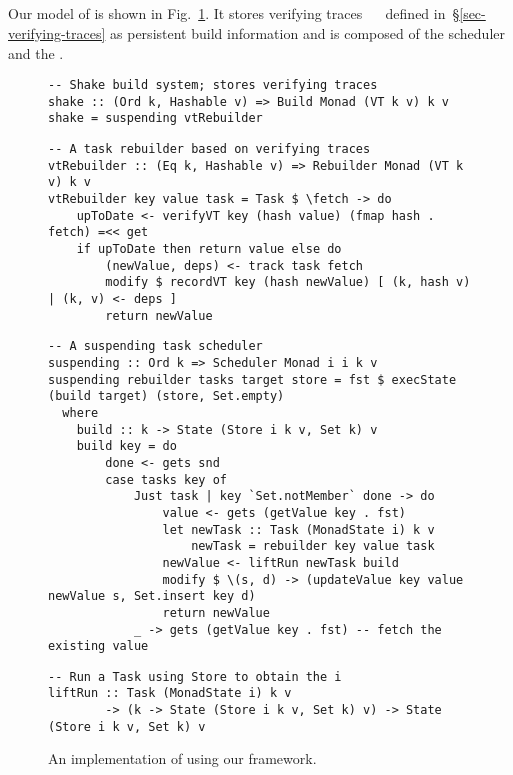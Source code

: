 \vspace{-1mm}
\subsection{\Shake}\label{sec-implementation-shake}
\vspace{-1mm}

Our model of \Shake is shown in Fig.~\ref{fig-shake-implementation}. It stores
verifying traces ~~ defined in~\S\ref{sec-verifying-traces}
as persistent build information and is composed of the  scheduler
and the .

\begin{figure}
\begin{verbatim}
-- Shake build system; stores verifying traces
shake :: (Ord k, Hashable v) => Build Monad (VT k v) k v
shake = suspending vtRebuilder
\end{verbatim}
\vspace{0mm}
\begin{verbatim}
-- A task rebuilder based on verifying traces
vtRebuilder :: (Eq k, Hashable v) => Rebuilder Monad (VT k v) k v
vtRebuilder key value task = Task $ \fetch -> do
    upToDate <- verifyVT key (hash value) (fmap hash . fetch) =<< get
    if upToDate then return value else do
        (newValue, deps) <- track task fetch
        modify $ recordVT key (hash newValue) [ (k, hash v) | (k, v) <- deps ]
        return newValue
\end{verbatim}
\vspace{0mm}
\begin{verbatim}
-- A suspending task scheduler
suspending :: Ord k => Scheduler Monad i i k v
suspending rebuilder tasks target store = fst $ execState (build target) (store, Set.empty)
  where
    build :: k -> State (Store i k v, Set k) v
    build key = do
        done <- gets snd
        case tasks key of
            Just task | key `Set.notMember` done -> do
                value <- gets (getValue key . fst)
                let newTask :: Task (MonadState i) k v
                    newTask = rebuilder key value task
                newValue <- liftRun newTask build
                modify $ \(s, d) -> (updateValue key value newValue s, Set.insert key d)
                return newValue
            _ -> gets (getValue key . fst) -- fetch the existing value
\end{verbatim}
\vspace{0mm}
\begin{verbatim}
-- Run a Task using Store to obtain the i
liftRun :: Task (MonadState i) k v
        -> (k -> State (Store i k v, Set k) v) -> State (Store i k v, Set k) v
\end{verbatim}
\vspace{-3mm}
\caption{An implementation of \Shake using our framework.}\label{fig-shake-implementation}
\vspace{-6mm}
\end{figure}

